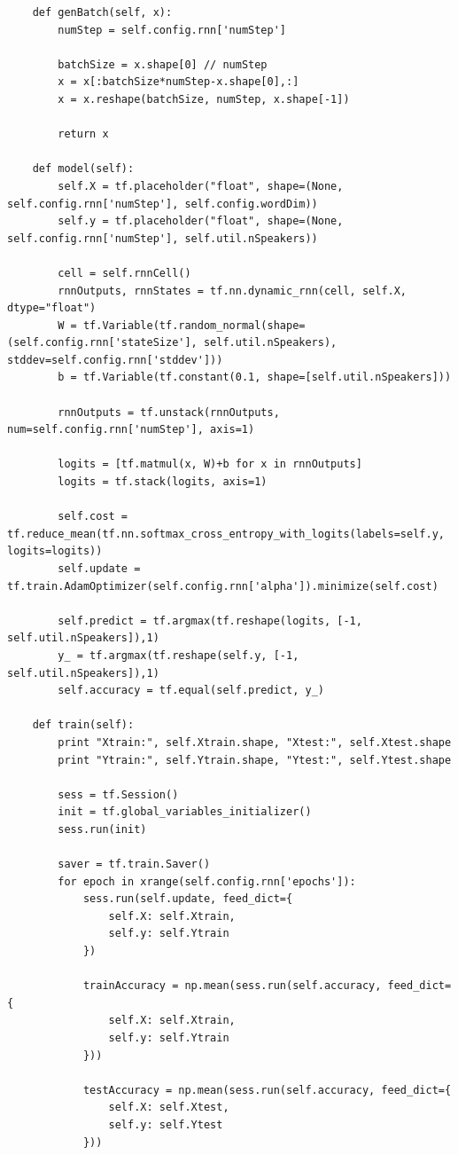 \documentclass[BTech]{srmuthesis}
\begin{document}
\begin{verbatim}
    def genBatch(self, x):
        numStep = self.config.rnn['numStep']

        batchSize = x.shape[0] // numStep
        x = x[:batchSize*numStep-x.shape[0],:]
        x = x.reshape(batchSize, numStep, x.shape[-1])

        return x

    def model(self):
        self.X = tf.placeholder("float", shape=(None, self.config.rnn['numStep'], self.config.wordDim))
        self.y = tf.placeholder("float", shape=(None, self.config.rnn['numStep'], self.util.nSpeakers))

        cell = self.rnnCell()
        rnnOutputs, rnnStates = tf.nn.dynamic_rnn(cell, self.X, dtype="float")
        W = tf.Variable(tf.random_normal(shape=(self.config.rnn['stateSize'], self.util.nSpeakers), stddev=self.config.rnn['stddev']))
        b = tf.Variable(tf.constant(0.1, shape=[self.util.nSpeakers]))

        rnnOutputs = tf.unstack(rnnOutputs, num=self.config.rnn['numStep'], axis=1)

        logits = [tf.matmul(x, W)+b for x in rnnOutputs]
        logits = tf.stack(logits, axis=1)

        self.cost = tf.reduce_mean(tf.nn.softmax_cross_entropy_with_logits(labels=self.y, logits=logits))
        self.update = tf.train.AdamOptimizer(self.config.rnn['alpha']).minimize(self.cost)

        self.predict = tf.argmax(tf.reshape(logits, [-1, self.util.nSpeakers]),1)
        y_ = tf.argmax(tf.reshape(self.y, [-1, self.util.nSpeakers]),1)
        self.accuracy = tf.equal(self.predict, y_)

    def train(self):
        print "Xtrain:", self.Xtrain.shape, "Xtest:", self.Xtest.shape
        print "Ytrain:", self.Ytrain.shape, "Ytest:", self.Ytest.shape

        sess = tf.Session()
        init = tf.global_variables_initializer()
        sess.run(init)

        saver = tf.train.Saver()
        for epoch in xrange(self.config.rnn['epochs']):
            sess.run(self.update, feed_dict={
                self.X: self.Xtrain,
                self.y: self.Ytrain
            })

            trainAccuracy = np.mean(sess.run(self.accuracy, feed_dict={
                self.X: self.Xtrain,
                self.y: self.Ytrain
            }))

            testAccuracy = np.mean(sess.run(self.accuracy, feed_dict={
                self.X: self.Xtest,
                self.y: self.Ytest
            }))


\end{verbatim}
\end{document}
